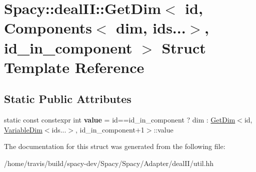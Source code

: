 \hypertarget{structSpacy_1_1dealII_1_1GetDim_3_01id_00_01Components_3_01dim_00_01ids_8_8_8_4_00_01id__in__component_01_4}{\section{Spacy\-:\-:deal\-I\-I\-:\-:Get\-Dim$<$ id, Components$<$ dim, ids...$>$, id\-\_\-in\-\_\-component $>$ Struct Template Reference}
\label{structSpacy_1_1dealII_1_1GetDim_3_01id_00_01Components_3_01dim_00_01ids_8_8_8_4_00_01id__in__component_01_4}
}
\subsection*{Static Public Attributes}
\begin{DoxyCompactItemize}
\item 
\hypertarget{structSpacy_1_1dealII_1_1GetDim_3_01id_00_01Components_3_01dim_00_01ids_8_8_8_4_00_01id__in__component_01_4_ab36373b25de958bd5a0ce630357da6f2}{static const constexpr int {\bfseries value} = id==id\-\_\-in\-\_\-component ? dim \-: \hyperlink{structSpacy_1_1dealII_1_1GetDim}{Get\-Dim}$<$id, \hyperlink{structSpacy_1_1dealII_1_1VariableDim}{Variable\-Dim}$<$ids...$>$, id\-\_\-in\-\_\-component+1$>$\-::value}\label{structSpacy_1_1dealII_1_1GetDim_3_01id_00_01Components_3_01dim_00_01ids_8_8_8_4_00_01id__in__component_01_4_ab36373b25de958bd5a0ce630357da6f2}

\end{DoxyCompactItemize}


The documentation for this struct was generated from the following file\-:\begin{DoxyCompactItemize}
\item 
/home/travis/build/spacy-\/dev/\-Spacy/\-Spacy/\-Adapter/deal\-I\-I/util.\-hh\end{DoxyCompactItemize}
